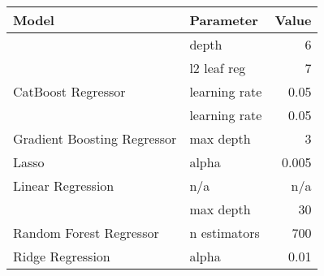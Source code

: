 
\begin{tabular}[t]{llr}
\toprule
\multicolumn{1}{l}{Model} & \multicolumn{1}{l}{Parameter} & \multicolumn{1}{l}{Value}\\
\midrule
 & depth & 6\\

 & l2 leaf reg & 7\\

\multirow[t]{-3}{*}{\raggedright\arraybackslash CatBoost Regressor} & learning rate & 0.05\\
\cmidrule(lr){1-3}

 & learning rate & 0.05\\

\multirow[t]{-2}{*}{\raggedright\arraybackslash Gradient Boosting Regressor} & max depth & 3\\
\cmidrule(lr){1-3}

Lasso & alpha & 0.005\\
\cmidrule(lr){1-3}

Linear Regression & n/a & n/a\\
\cmidrule(lr){1-3}

 & max depth & 30\\

\multirow[t]{-2}{*}{\raggedright\arraybackslash Random Forest Regressor} & n estimators & 700\\
\cmidrule(lr){1-3}

Ridge Regression & alpha & 0.01\\
\bottomrule
\end{tabular}
